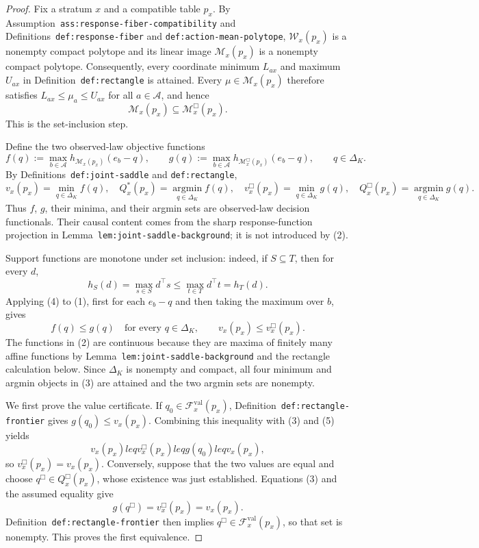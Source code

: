 \documentclass{article}
\begin{document}
\begin{proof}
Fix a stratum \(x\) and a compatible table \(p_x\).  By Assumption~\texttt{ass:response-fiber-compatibility} and Definitions~\texttt{def:response-fiber} and \texttt{def:action-mean-polytope}, \(\mathcal W_x(p_x)\) is a nonempty compact polytope and its linear image \(\mathcal M_x(p_x)\) is a nonempty compact polytope.  Consequently, every coordinate minimum \(L_{ax}\) and maximum \(U_{ax}\) in Definition~\texttt{def:rectangle} is attained.  Every \(\mu\in\mathcal M_x(p_x)\) therefore satisfies \(L_{ax}\leq\mu_a\leq U_{ax}\) for all \(a\in\mathcal A\), and hence
\[
 \mathcal M_x(p_x)\subseteq\mathcal M_x^{\Box}(p_x).
\tag{1}
\]
This is the set-inclusion step.

Define the two observed-law objective functions
\[
 f(q):=\max_{b\in\mathcal A}h_{\mathcal M_x(p_x)}(e_b-q),
 \qquad
 g(q):=\max_{b\in\mathcal A}h_{\mathcal M_x^{\Box}(p_x)}(e_b-q),
 \qquad q\in\Delta_K.
\tag{2}
\]
By Definitions~\texttt{def:joint-saddle} and \texttt{def:rectangle},
\[
 v_x(p_x)=\min_{q\in\Delta_K}f(q),\quad
 Q_x^*(p_x)=\operatorname*{argmin}_{q\in\Delta_K}f(q),
\quad
 v_x^{\Box}(p_x)=\min_{q\in\Delta_K}g(q),\quad
 Q_x^{\Box}(p_x)=\operatorname*{argmin}_{q\in\Delta_K}g(q).
\tag{3}
\]
Thus \(f\), \(g\), their minima, and their argmin sets are observed-law decision functionals.  Their causal content comes from the sharp response-function projection in Lemma~\texttt{lem:joint-saddle-background}; it is not introduced by (2).

Support functions are monotone under set inclusion: indeed, if \(S\subseteq T\), then for every \(d\),
\[
 h_S(d)=\max_{s\in S}d^\top s\leq\max_{t\in T}d^\top t=h_T(d).
\tag{4}
\]
Applying (4) to (1), first for each \(e_b-q\) and then taking the maximum over \(b\), gives
\[
 f(q)\leq g(q)\quad\text{for every }q\in\Delta_K,
 \qquad
 v_x(p_x)\leq v_x^{\Box}(p_x).
\tag{5}
\]
The functions in (2) are continuous because they are maxima of finitely many affine functions by Lemma~\texttt{lem:joint-saddle-background} and the rectangle calculation below.  Since \(\Delta_K\) is nonempty and compact, all four minimum and argmin objects in (3) are attained and the two argmin sets are nonempty.

We first prove the value certificate.  If \(q_0\in\mathcal F_x^{\mathrm{val}}(p_x)\), Definition~\texttt{def:rectangle-frontier} gives \(g(q_0)\leq v_x(p_x)\).  Combining this inequality with (3) and (5) yields
\[
 v_x(p_x)leq v_x^{\Box}(p_x)leq g(q_0)leq v_x(p_x),
\tag{6}
\]
so \(v_x^{\Box}(p_x)=v_x(p_x)\).  Conversely, suppose that the two values are equal and choose \(q^{\Box}\in Q_x^{\Box}(p_x)\), whose existence was just established.  Equations (3) and the assumed equality give
\[
 g(q^{\Box})=v_x^{\Box}(p_x)=v_x(p_x).
\tag{7}
\]
Definition~\texttt{def:rectangle-frontier} then implies \(q^{\Box}\in\mathcal F_x^{\mathrm{val}}(p_x)\), so that set is nonempty.  This proves the first equivalence.


\end{proof}
\end{document}
